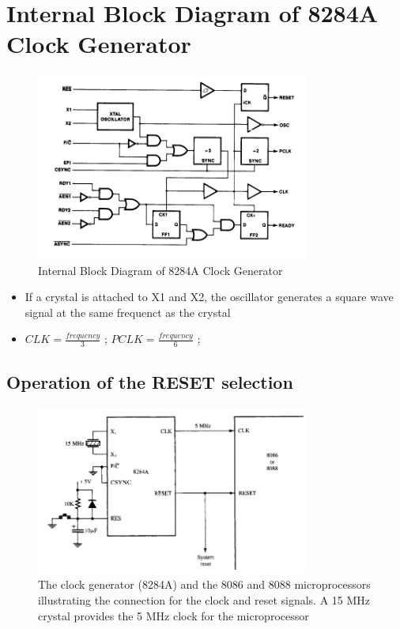 \section{Internal Block Diagram of 8284A Clock Generator}
\begin{figure}[h!]
    \centering
    \includegraphics[width = 0.8\textwidth]{./figures/8284A_internal.png}
    \caption{Internal Block Diagram of 8284A Clock Generator}
    \label{fig:b2}
\end{figure}

\begin{itemize}
  \item If a crystal is attached to X1 and X2, the oscillator generates a square wave signal at the same frequenct as the crystal
  \item $CLK = \frac{frequency}{3}$ ; $PCLK = \frac{frequency}{6}$ ;
\end{itemize}
\newpage
\subsection{Operation of the RESET selection}
\begin{figure}[h!]
    \centering
    \includegraphics[width = 0.8\textwidth]{./figures/8284A_reset.png}
    \caption{The clock generator (8284A) and the 8086 and 8088 microprocessors illustrating
the connection for the clock and reset signals. A 15 MHz crystal provides the 5 MHz clock for the
microprocessor}
    \label{fig:b3}
\end{figure}

